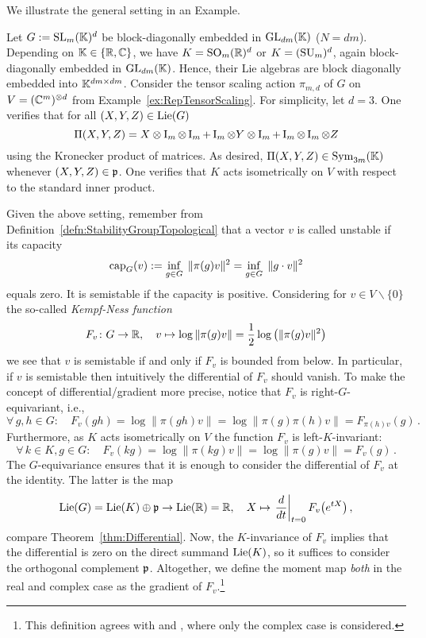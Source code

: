 We illustrate the general setting in an Example.

\begin{example}\label{ex:MomentMapSetting}
	Let $G := \operatorname{SL}_m(\mathbb K)^d$ be block-diagonally embedded in $\operatorname{GL}_{dm}(\mathbb K)$ ($N = dm$). Depending on $\mathbb K \in \{\mathbb R, \mathbb C\}$, we have $K = \operatorname{SO}_m(\mathbb R)^d$ or $K = (\operatorname{SU}_m)^d$, again block-diagonally embedded in $\operatorname{GL}_{dm}(\mathbb K)$. Hence, their Lie algebras are block diagonally embedded into $\mathbb K^{dm \times dm}$.
	Consider the tensor scaling action $\pi_{m,d}$ of $G$ on $V = (\mathbb C^m)^{\otimes d}$ from Example~\ref{ex:RepTensorScaling}. For simplicity, let $d=3$. One verifies that for all $(X,Y,Z) \in \operatorname{Lie}(G)$
		\[ \Pi(X,Y,Z) = X \otimes \operatorname{I}_m \otimes \operatorname{I}_m + \operatorname{I}_m \otimes Y \otimes \operatorname{I}_m + \operatorname{I}_m \otimes \operatorname{I}_m \otimes Z \]
	using the Kronecker product of matrices. As desired, $\Pi(X,Y,Z) \in \operatorname{Sym}_{3m}(\mathbb K)$ whenever $(X,Y,Z) \in \mathfrak{p}$.
	One verifies that $K$ acts isometrically on $V$ with respect to the standard inner product.
	\hfill\exSymbol
\end{example}


Given the above setting, remember from Definition~\ref{defn:StabilityGroupTopological} that a vector $v$ is called unstable if its capacity
	\[ \operatorname{cap}_G(v) := \inf_{g \in G} \; \| \pi(g) v \|^2 = \inf_{g \in G} \; \| g \cdot v \|^2  \]
equals zero. It is semistable if the capacity is positive. Considering for $v \in V \backslash \{0\}$ the so-called \emph{Kempf-Ness function}
	\begin{equation} \label{eq:KempfNessFunction}
		F_v \colon G \to \mathbb R, \quad v \mapsto \log \| \pi(g)v \| = \frac{1}{2} \log \big( \| \pi(g)v \|^2 \big)
	\end{equation}
we see that $v$ is semistable if and only if $F_v$ is bounded from below. In particular, if $v$ is semistable then intuitively the differential of $F_v$ should vanish. To make the concept of differential/gradient more precise, notice that $F_v$ is right-$G$-equivariant, i.e.,
	\[ \forall \, g,h \in G \colon \quad F_v(gh) = \log \| \pi(gh) v \|  = \log \| \pi(g) \pi(h) v\| = F_{\pi(h)v} (g) \, . \]
Furthermore, as $K$ acts isometrically on $V$ the function $F_v$ is left-$K$-invariant:
	\[ \forall\, k \in K, g \in G \colon \quad F_v(kg) = \log \| \pi(kg)v \| = \log \| \pi(g)v \| = F_v(g) \, . \]
The $G$-equivariance ensures that it is enough to consider the differential of $F_v$ at the identity. The latter is the map
	\[ \operatorname{Lie}(G) = \operatorname{Lie}(K) \oplus \mathfrak{p} \to \operatorname{Lie}(\mathbb R) = \mathbb R, \quad X \mapsto \left. \frac{d}{dt} \right|_{t=0} F_v \big( e^{tX} \big) \, , \]
compare Theorem~\ref{thm:Differential}. Now, the $K$-invariance of $F_v$ implies that the differential is zero on the direct summand $\operatorname{Lie}(K)$, so it suffices to consider the orthogonal complement $\mathfrak{p}$.
Altogether, we define the moment map \emph{both} in the real and complex case as the gradient of $F_v$.\footnote{This definition agrees with \cite[Definition~3.2]{GradflowArXiv} and \cite[Definition~4.1]{WeightMargin}, where only the complex case is considered.}

